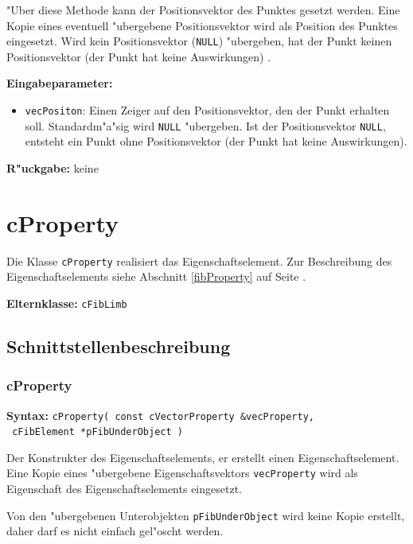 \bigskip\noindent
"Uber diese Methode kann der Positionsvektor des Punktes gesetzt werden. Eine Kopie eines eventuell "ubergebene Positionsvektor wird als Position des Punktes eingesetzt. Wird kein Positionsvektor (\verb|NULL|) "ubergeben, hat der Punkt keinen Positionsvektor (der Punkt hat keine Auswirkungen) .

\bigskip\noindent
\textbf{Eingabeparameter:}
\begin{itemize}
 \item \verb|vecPositon|: Einen Zeiger auf den Positionsvektor, den der Punkt erhalten soll. Standardm"a"sig wird \verb|NULL| "ubergeben. Ist der Positionsvektor \verb|NULL|, entsteht ein Punkt ohne Positionsvektor (der Punkt hat keine Auswirkungen).
\end{itemize}

\bigskip\noindent
\textbf{R"uckgabe:} keine


\section{cProperty}

Die Klasse \verb|cProperty| realisiert das Eigenschaftselement.
Zur Beschreibung des Eigenschaftselements siehe Abschnitt \ref{fibProperty} auf Seite \pageref{fibProperty} .

\bigskip\noindent
\textbf{Elternklasse:} \verb|cFibLimb|


\subsection{Schnittstellenbeschreibung}


\subsubsection{cProperty}

\textbf{Syntax:} \verb|cProperty( const cVectorProperty &vecProperty,| \\\verb| cFibElement *pFibUnderObject )|

\bigskip\noindent
Der Konstrukter des Eigenschaftselements, er erstellt einen Eigenschaftselement. Eine Kopie eines "ubergebene Eigenschaftsvektors \verb|vecProperty| wird als Eigenschaft des Eigenschaftselements eingesetzt.

Von den "ubergebenen Unterobjekten \verb|pFibUnderObject| wird keine Kopie erstellt, daher darf es nicht einfach gel"oscht werden.

